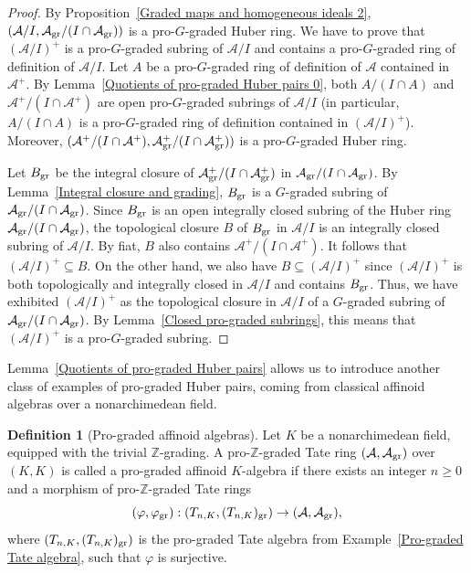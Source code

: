 \documentclass[12pt,twoside,a4paper]{article}
\theoremstyle{definition}
\newtheorem{mydef}[thm]{Definition}
\theoremstyle{remark}
\newcommand\gr{{\rm gr}}
\begin{document}
\begin{proof}By Proposition~\ref{Graded maps and homogeneous ideals 2}, $(\mathcal{A}/I, \mathcal{A}_{\gr}/(I\cap \mathcal{A}_{\gr}))$ is a pro-$G$-graded Huber ring. We have to prove that $(\mathcal{A}/I)^{+}$ is a pro-$G$-graded subring of $\mathcal{A}/I$ and contains a pro-$G$-graded ring of definition of $\mathcal{A}/I$. Let $A$ be a pro-$G$-graded ring of definition of $\mathcal{A}$ contained in $\mathcal{A}^{+}$. By Lemma~\ref{Quotients of pro-graded Huber pairs 0}, both $A/(I\cap A)$ and $\mathcal{A}^{+}/(I\cap \mathcal{A}^{+})$ are open pro-$G$-graded subrings of $\mathcal{A}/I$ (in particular, $A/(I\cap A)$ is a pro-$G$-graded ring of definition contained in $(\mathcal{A}/I)^{+}$). Moreover, $(\mathcal{A}^{+}/(I\cap \mathcal{A}^{+}), \mathcal{A}_{\gr}^{+}/(I\cap \mathcal{A}_{\gr}^{+}))$ is a pro-$G$-graded Huber ring.

Let $B_{\gr}$ be the integral closure of $\mathcal{A}_{\gr}^{+}/(I\cap \mathcal{A}_{\gr}^{+})$ in $\mathcal{A}_{\gr}/(I\cap \mathcal{A}_{\gr})$. By Lemma~\ref{Integral closure and grading}, $B_{\gr}$ is a $G$-graded subring of $\mathcal{A}_{\gr}/(I\cap \mathcal{A}_{\gr})$. Since $B_{\gr}$ is an open integrally closed subring of the Huber ring $\mathcal{A}_{\gr}/(I\cap \mathcal{A}_{\gr})$, the topological closure $B$ of $B_{\gr}$ in $\mathcal{A}/I$ is an integrally closed subring of $\mathcal{A}/I$. By fiat, $B$ also contains $\mathcal{A}^{+}/(I\cap \mathcal{A}^{+})$. It follows that $(\mathcal{A}/I)^{+}\subseteq B$. On the other hand, we also have $B\subseteq (\mathcal{A}/I)^{+}$ since $(\mathcal{A}/I)^{+}$ is both topologically and integrally closed in $\mathcal{A}/I$ and contains $B_{\gr}$. Thus, we have exhibited $(\mathcal{A}/I)^{+}$ as the topological closure in $\mathcal{A}/I$ of a $G$-graded subring of $\mathcal{A}_{\gr}/(I\cap \mathcal{A}_{\gr})$. By Lemma~\ref{Closed pro-graded subrings}, this means that $(\mathcal{A}/I)^{+}$ is a pro-$G$-graded subring. \end{proof}
Lemma~\ref{Quotients of pro-graded Huber pairs} allows us to introduce another class of examples of pro-graded Huber pairs, coming from classical affinoid algebras over a nonarchimedean field. 
\begin{mydef}[Pro-graded affinoid algebras]\label{Pro-graded affinoid algebras, definition}Let $K$ be a nonarchimedean field, equipped with the trivial $\mathbb{Z}$-grading. A pro-$\mathbb{Z}$-graded Tate ring $(\mathcal{A}, \mathcal{A}_{\gr})$ over $(K, K)$ is called a pro-graded affinoid $K$-algebra if there exists an integer $n\geq0$ and a morphism of pro-$\mathbb{Z}$-graded Tate rings \begin{equation*}(\varphi, \varphi_{\gr}): (T_{n, K}, (T_{n, K})_{\gr})\to (\mathcal{A}, \mathcal{A}_{\gr}),\end{equation*}where $(T_{n, K}, (T_{n, K})_{\gr})$ is the pro-graded Tate algebra from Example~\ref{Pro-graded Tate algebra}, such that $\varphi$ is surjective.\end{mydef}
\end{document}
